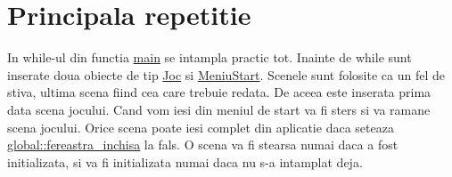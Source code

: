 \hypertarget{group__group__main__loop}{}\section{Principala repetitie}
\label{group__group__main__loop}
In while-\/ul din functia \hyperlink{main_8cpp_ae66f6b31b5ad750f1fe042a706a4e3d4}{main} se intampla practic tot. Inainte de while sunt inserate doua obiecte de tip \hyperlink{classJoc}{Joc} si \hyperlink{classMeniuStart}{Meniu\+Start}. Scenele sunt folosite ca un fel de stiva, ultima scena fiind cea care trebuie redata. De aceea este inserata prima data scena jocului. Cand vom iesi din meniul de start va fi sters si va ramane scena jocului. Orice scena poate iesi complet din aplicatie daca seteaza \hyperlink{namespaceglobal_a930b1255fa49cd41dc635136822d56ee}{global\+::fereastra\+\_\+inchisa} la fals. O scena va fi stearsa numai daca a fost initializata, si va fi initializata numai daca nu s-\/a intamplat deja. 